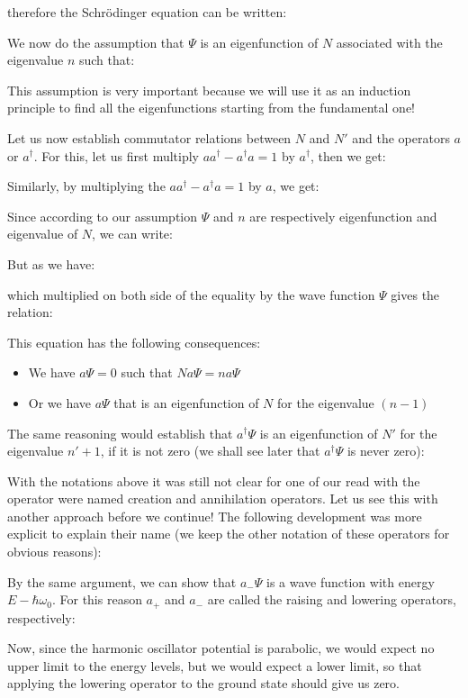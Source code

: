 	therefore the Schrödinger equation can be written:
	
	We now do the assumption that $\Psi$ is an eigenfunction of $N$ associated with the eigenvalue $n$ such that:
	
	This assumption is very important because we will use it as an induction principle to find all the eigenfunctions starting from the fundamental one!

	Let us now establish commutator relations between $N$ and $N'$ and the operators $a$ or $a^\dagger$. For this, let us first multiply $aa^\dagger-a^\dagger a=1$ by $a^\dagger$, then we get:
	
	Similarly, by multiplying the $aa^\dagger-a^\dagger a=1$ by $a$, we get:
	
	Since according to our assumption $\Psi$ and $n$ are respectively eigenfunction and eigenvalue of $N$, we can write:
	
	But as we have:
	
	which multiplied on both side of the equality by the wave function $\Psi$ gives the relation:
	
	This equation has the following consequences:
	\begin{itemize}
		\item We have $a\Psi=0$ such that $Na\Psi=na\Psi$
		\item Or we have $a\Psi$ that is an eigenfunction of $N$ for the eigenvalue $(n-1)$
	\end{itemize}
	The same reasoning would establish that $a^\dagger\Psi$ is an eigenfunction of $N'$ for the eigenvalue $n' + 1$, if it is not zero (we shall see later that $a^\dagger\Psi$ is never zero):
	
	With the notations above it was still not clear for one of our read with the operator were named creation and annihilation operators. Let us see this with another approach before we continue! The following development was more explicit to explain their name (we keep the other notation of these operators for obvious reasons):
	
	By the same argument, we can show that $a_{-}\Psi$ is a wave function with energy $E-\hbar\omega_0$. For this reason $a_{+}$ and $a_{-}$ are called the raising and lowering operators, respectively:
	
	Now, since the harmonic oscillator potential is parabolic, we would expect no upper limit to the energy levels, but we would expect a lower limit, so that applying the lowering operator to the ground state should give us zero.
	
